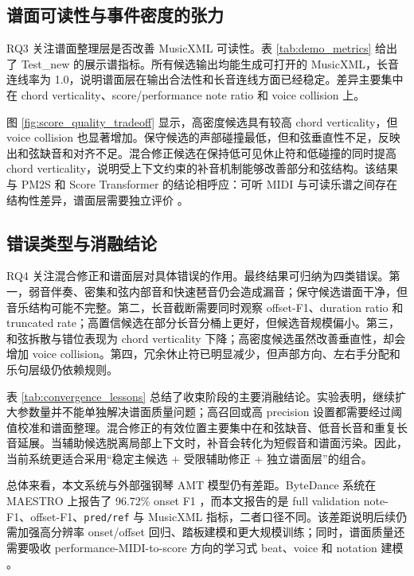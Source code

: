 \documentclass[UTF8,a4paper,zihao=-4]{ctexart}
\newcommand{\code}[1]{\texttt{#1}}
\begin{document}
\subsection{谱面可读性与事件密度的张力}

RQ3 关注谱面整理层是否改善 MusicXML 可读性。表 \ref{tab:demo_metrics} 给出了 Test\_new 的展示谱指标。所有候选输出均能生成可打开的 MusicXML，长音连线率为 1.0，说明谱面层在输出合法性和长音连线方面已经稳定。差异主要集中在 chord verticality、score/performance note ratio 和 voice collision 上。



图 \ref{fig:score_quality_tradeoff} 显示，高密度候选具有较高 chord verticality，但 voice collision 也显著增加。保守候选的声部碰撞最低，但和弦垂直性不足，反映出和弦缺音和对齐不足。混合修正候选在保持低可见休止符和低碰撞的同时提高 chord verticality，说明受上下文约束的补音机制能够改善部分和弦结构。该结果与 PM2S 和 Score Transformer 的结论相呼应：可听 MIDI 与可读乐谱之间存在结构性差异，谱面层需要独立评价 \cite{liu2022pm2s,suzuki2021scoretransformer}。



\subsection{错误类型与消融结论}

RQ4 关注混合修正和谱面层对具体错误的作用。最终结果可归纳为四类错误。第一，弱音伴奏、密集和弦内部音和快速琶音仍会造成漏音；保守候选谱面干净，但音乐结构可能不完整。第二，长音截断需要同时观察 offset-F1、duration ratio 和 truncated rate；高置信候选在部分长音分桶上更好，但候选音规模偏小。第三，和弦拆散与错位表现为 chord verticality 下降；高密度候选虽然改善垂直性，却会增加 voice collision。第四，冗余休止符已明显减少，但声部方向、左右手分配和乐句层级仍依赖规则。

表 \ref{tab:convergence_lessons} 总结了收束阶段的主要消融结论。实验表明，继续扩大参数量并不能单独解决谱面质量问题；高召回或高 precision 设置都需要经过阈值校准和谱面整理。混合修正的有效位置主要集中在和弦缺音、低音长音和重复长音延展。当辅助候选脱离局部上下文时，补音会转化为短假音和谱面污染。因此，当前系统更适合采用“稳定主候选 + 受限辅助修正 + 独立谱面层”的组合。



总体来看，本文系统与外部强钢琴 AMT 模型仍有差距。ByteDance 系统在 MAESTRO 上报告了 96.72\% onset F1 \cite{kong2021highres}，而本文报告的是 full validation note-F1、offset-F1、\code{pred/ref} 与 MusicXML 指标，二者口径不同。该差距说明后续仍需加强高分辨率 onset/offset 回归、踏板建模和更大规模训练；同时，谱面质量还需要吸收 performance-MIDI-to-score 方向的学习式 beat、voice 和 notation 建模 \cite{liu2022pm2s,beyer2024midi2score}。
\end{document}
